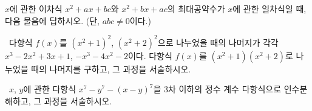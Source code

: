 \documentclass[]{gshs_exam_Q}
\begin{document}
\maketitle

\begin{multicols*}{2}
\noindent{}\vspace{1em}

\begin{questions}
\extrawidth{8.1em}
\addpoints
\question $x$에 관한 이차식 $x^2 +ax+bc$와 $x^2 +bx+ac$의 최대공약수가 $x$에 관한 일차식일 때, 다음 물음에 답하시오. (단, $abc\ne 0$이다.)\droptotalpoints
\vspace{1em}

\vspace*{\fill}
\columnbreak

\vspace*{-0.8em}

\question[7] \ssh\ 다항식 $f(x)$를 $(x^2 +1)^2$, $(x^2 +2)^2$으로 나누었을 때의 나머지가 각각 $x^3 -2x^2 +3x+1$, $-x^3 -4x^2 -2$이다. 다항식 $f(x)$를 $(x^2 +1)(x^2 +2)$로 나누었을 때의 나머지를 구하고, 그 과정을 서술하시오.\droppoints

\vspace{30em}

\question[8] \nsh\ $x$, $y$에 관한 다항식 $x^7 -y^7 -(x-y)^7$을 $3$차 이하의 정수 계수 다항식으로 인수분해하고, 그 과정을 서술하시오.\par\droppoints

\end{questions}
\end{multicols*}
\end{document}
